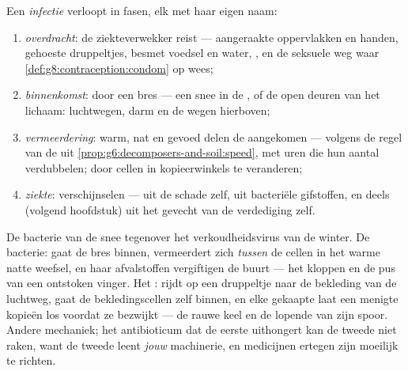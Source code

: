 \begin{definition}\label{def:g9:microbes-and-infection:stages}
Een \emph{infectie} verloopt in fasen, elk met haar
eigen naam:
\begin{enumerate}
  \item \emph{overdracht}: de ziekteverwekker reist ---
        aangeraakte oppervlakken en handen, gehoeste druppeltjes,
        besmet voedsel en water, , en de seksuele weg waar
        \cref{def:g8:contraception:condom} op wees;
  \item \emph{binnenkomst}: door een bres --- een snee in de ,
        of de open deuren van het lichaam: luchtwegen, darm en de
        wegen hierboven;
  \item \emph{vermeerdering}: warm, nat en gevoed delen de
        aangekomen  ---  volgens de regel van de
         uit
        \cref{prop:g6:decomposers-and-soil:speed}, met uren die
        hun aantal verdubbelen;  door cellen in
        kopieerwinkels te veranderen;
  \item \emph{ziekte}: verschijnselen --- uit de schade zelf, uit
        bacteriële gifstoffen, en deels (volgend hoofdstuk) uit
        het gevecht van de verdediging zelf.
\end{enumerate}
\end{definition}

\begin{example}\label{ex:g9:microbes-and-infection:contrast}
De bacterie van de snee tegenover het verkoudheidsvirus van de
winter. De bacterie: gaat de bres binnen, vermeerdert zich
\emph{tussen} de cellen in het warme natte weefsel, en haar
afvalstoffen vergiftigen de buurt --- het kloppen en de pus van een
ontstoken vinger. Het : rijdt op een druppeltje naar de
bekleding van de luchtweg, gaat de bekledingscellen zelf binnen, en
elke gekaapte  laat een menigte kopieën los voordat ze bezwijkt
--- de rauwe keel en de lopende  van zijn spoor. Andere
mechaniek; het antibioticum dat de eerste uithongert kan de tweede
niet raken, want de tweede leent \emph{jouw} machinerie, en
medicijnen ertegen zijn moeilijk te richten.
\end{example}

